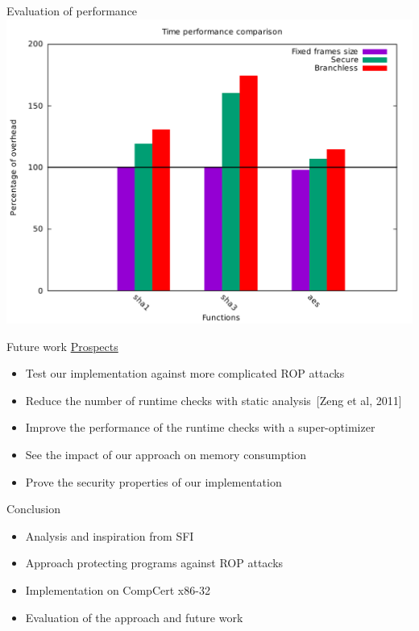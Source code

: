 \documentclass{beamer}
\begin{document}
\begin{frame}[c]{Evaluation of performance }
	\includegraphics[width=\textwidth]{images/percentage_focus.pdf}
\end{frame}


\begin{frame}[c]{Future work}
	\underline{Prospects}
	\begin{itemize}
		\item Test our implementation against more complicated ROP attacks
		\item Reduce the number of runtime checks with static analysis~[Zeng et al, 2011]
		\item Improve the performance of the runtime checks with a super-optimizer
		\item See the impact of our approach on memory consumption
		\item Prove the security properties of our implementation
	\end{itemize}
\end{frame}

\begin{frame}[c]{Conclusion}
	\begin{itemize}\itemsep16pt
		\item Analysis and inspiration from SFI
		\item Approach protecting programs against ROP attacks
		\item Implementation on CompCert x86-32
		\item Evaluation of the approach and future work
	\end{itemize}
\end{frame}
\end{document}
